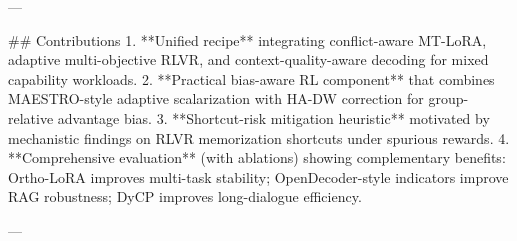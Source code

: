 ---

## Contributions  
1. **Unified recipe** integrating conflict-aware MT-LoRA, adaptive multi-objective RLVR, and context-quality-aware decoding for mixed capability workloads.  
2. **Practical bias-aware RL component** that combines MAESTRO-style adaptive scalarization with HA-DW correction for group-relative advantage bias.  
3. **Shortcut-risk mitigation heuristic** motivated by mechanistic findings on RLVR memorization shortcuts under spurious rewards.  
4. **Comprehensive evaluation** (with ablations) showing complementary benefits: Ortho-LoRA improves multi-task stability; OpenDecoder-style indicators improve RAG robustness; DyCP improves long-dialogue efficiency.

---